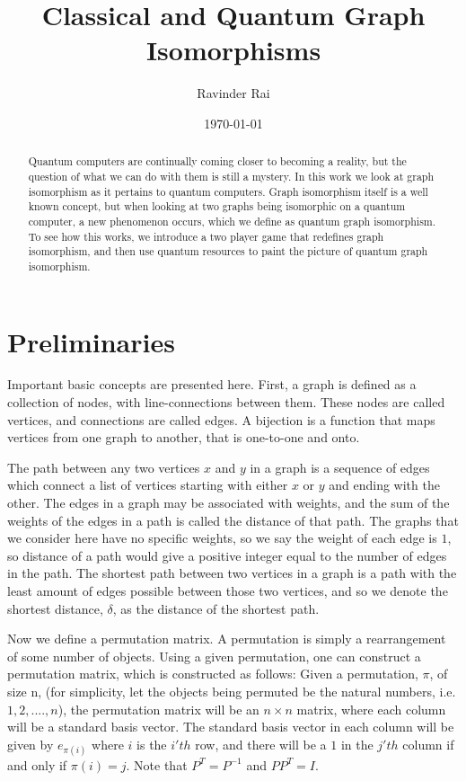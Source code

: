 \documentclass[12pt]{article}
\title{\textbf{Classical and Quantum Graph Isomorphisms}}
\author{Ravinder Rai}
\date{\today}
\begin{document}
 

\maketitle

\begin{abstract}
Quantum computers are continually coming closer to becoming a reality, but the question of what we can do with them is still a mystery. In this work we look at graph isomorphism as it pertains to quantum computers. Graph isomorphism itself is a well known concept, but when looking at two graphs being isomorphic on a quantum computer, a new phenomenon occurs, which we define as quantum graph isomorphism. To see how this works, we introduce a two player game that redefines graph isomorphism, and then use quantum resources to paint the picture of quantum graph isomorphism. 
\end{abstract}

\newpage
\section{Preliminaries} \label{prelim}
Important basic concepts are presented here. First, a graph is defined as a collection of nodes, with line-connections between them. These nodes are called vertices, and connections are called edges. A bijection is a function that maps vertices from one graph to another, that is one-to-one and onto.

The path between any two vertices $x$ and $y$ in a graph is a sequence of edges which connect a list of vertices starting with either $x$ or $y$ and ending with the other. The edges in a graph may be associated with weights, and the sum of the weights of the edges in a path is called the distance of that path. The graphs that we consider here have no specific weights, so we say the weight of each edge is $1$, so distance of a path would give a positive integer equal to the number of edges in the path. The shortest path between two vertices in a graph is a path with the least amount of edges possible between those two vertices, and so we denote the shortest distance, $\delta$, as the distance of the shortest path. 


Now we define a permutation matrix. A permutation is simply a rearrangement of some number of objects. Using a given permutation, one can construct a permutation matrix, which is constructed as follows: Given a permutation, $\pi$, of size n, (for simplicity, let the objects being permuted be the natural numbers, i.e. $1, 2, ...., n$), the permutation matrix will be an $n \times n$ matrix, where each column will be a standard basis vector. The standard basis vector in each column will be given by $e_{\pi(i)}$ where $i$ is the $i'th$ row, and there will be a $1$ in the $j'th$ column if and only if $\pi(i) = j$. Note that $P^T = P^{-1}$ and $PP^T = I$. 
\end{document}
